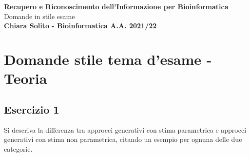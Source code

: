 \documentclass{article}
\begin{document}
    \begin{center}
        \vspace{0.5cm}
        \LARGE
        \textbf{Recupero e Riconoscimento dell'Informazione per Bioinformatica}
        Domande in stile esame\\
        \vspace{0.5cm}
        \small
        \textbf{Chiara Solito - Bioinformatica A.A. 2021/22}
    \end{center}


\section*{Domande stile tema d'esame - Teoria}

\subsection*{Esercizio 1}
Si descriva la differenza tra approcci generativi con stima parametrica e
approcci generativi con stima non parametrica, citando un esempio per ognuna
delle due categorie.
\end{document}
